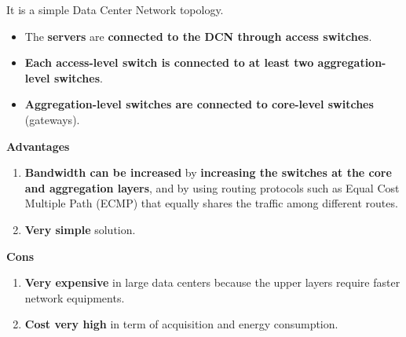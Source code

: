 \noindent
It is a simple Data Center Network topology. 
\begin{itemize}
    \item The \textbf{servers} are \textbf{connected to the DCN through access switches}.
    \item \textbf{Each access-level switch is connected to at least two aggregation-level switches}.
    \item \textbf{Aggregation-level switches are connected to core-level switches} (gateways).
\end{itemize}
\begin{flushleft}
    \textcolor{Green3}{ \textbf{Advantages}}
\end{flushleft}
\begin{enumerate}
    \item \textbf{Bandwidth can be increased} by \textbf{increasing the switches at the core and aggregation layers}, and by using routing protocols such as Equal Cost Multiple Path (ECMP) that equally shares the traffic among different routes.
    \item \textbf{Very simple} solution.
\end{enumerate}
\begin{flushleft}
    \textcolor{Red2}{ \textbf{Cons}}
\end{flushleft}
\begin{enumerate}
    \item \textbf{Very expensive} in large data centers because the upper layers require faster network equipments.
    \item \textbf{Cost very high} in term of acquisition and energy consumption.
\end{enumerate}

\newpage

